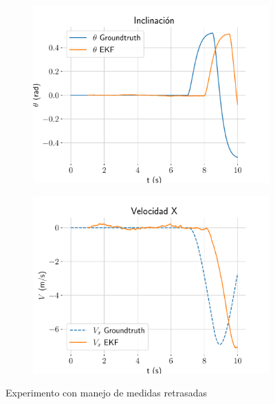 \begin{figure}
\begin{subfigure}[t]{0.49\textwidth}
		\caption{}
		\label{fig:handle-yt}		
	\end{subfigure}
	\quad
	\hspace*{-0.5cm}
	\begin{subfigure}[t]{0.49\textwidth}
		\centering
		\includegraphics[width=\textwidth]{estimador_px4/im_simu/handle_delay/theta}
		\caption{}
		\label{fig:handle-theta}		
	\end{subfigure}
	\quad
	\begin{subfigure}[t]{0.49\textwidth}
		\centering
		\includegraphics[width=\textwidth]{estimador_px4/im_simu/handle_delay/vx}
		\caption{}
		\label{fig:handle-vx}		
	\end{subfigure}
	\quad
	\caption{Experimento con manejo de medidas retrasadas}\label{fig:handle}
\end{figure}





\endinput
